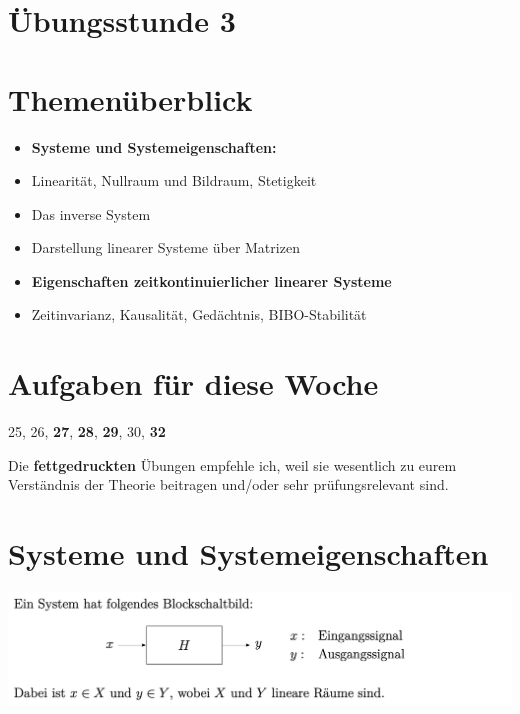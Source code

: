 \documentclass[11pt]{article}
\begin{document}
\thispagestyle{firstpage}

\setlength{\headheight}{1 \baselineskip}  %
\setlength{\parindent}{0pt}  %
\setlength{\parskip}{\baselineskip}  %

\vspace*{-5px}
\section*{Übungsstunde 3}

\section*{Themenüberblick}
\begin{itemize}
    \item \textbf{Systeme und Systemeigenschaften:}
    \item[] Linearität, Nullraum und Bildraum, Stetigkeit
    \item[] Das inverse System
    \item[] Darstellung linearer Systeme über Matrizen
    \item \textbf{Eigenschaften zeitkontinuierlicher linearer Systeme}
    \item[] Zeitinvarianz, Kausalität, Gedächtnis, BIBO-Stabilität
\end{itemize}

\section*{Aufgaben für diese Woche}
\vspace{-0.5cm}

25, 26, \textbf{27}, \textbf{28}, \textbf{29}, 30, \textbf{32}\\
\vspace{-0.5cm}

Die \textbf{fettgedruckten} Übungen empfehle ich, weil sie wesentlich zu eurem Verständnis der Theorie beitragen und/oder sehr prüfungsrelevant sind.

\vfill \null
\pagebreak

\section*{Systeme und Systemeigenschaften}
\vspace*{-0.5cm}
\hspace{-0.3cm}
\includegraphics[width=0.95\linewidth]{docimgs/System_Blockschaltbild.png}
\end{document}
